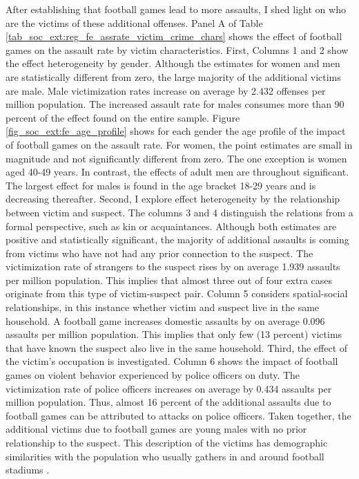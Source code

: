 

After establishing that football games lead to more assaults, I shed light on who are the victims of these additional offenses. Panel A of Table \ref{tab_soc_ext:reg_fe_assrate_victim_crime_chars} shows the effect of football games on the assault rate by victim characteristics. First, Columns 1 and 2 show the effect heterogeneity by gender. Although the estimates for women and men are statistically different from zero, the large majority of the additional victims are male. Male victimization rates increase on average by 2.432 offenses per million population. The increased assault rate for males consumes more than 90 percent of the effect found on the entire sample. Figure \ref{fig_soc_ext:fe_age_profile} shows for each gender the age profile of the impact of football games on the assault rate. For women, the point estimates are small in magnitude and not significantly different from zero. The one exception is women aged 40-49 years. In contrast, the effects of adult men are throughout significant. The largest effect for males is found in the age bracket 18-29 years and is decreasing thereafter. Second, I explore effect heterogeneity by the relationship between victim and suspect. The columns 3 and 4 distinguish the relations from a formal perspective, such as kin or acquaintances. Although both estimates are positive and statistically significant, the majority of additional assaults is coming from victims who have not had any prior connection to the suspect. The victimization rate of strangers to the suspect rises by on average 1.939 assaults per million population. This implies that almost three out of four extra cases originate from this type of victim-suspect pair. Column 5 considers spatial-social relationships, in this instance whether victim and suspect live in the same household. A football game increases domestic assaults by on average 0.096 assaults per million population. This implies that only few (13 percent) victims that have known the suspect also live in the same household. Third, the effect of the victim's occupation is investigated. Column 6 shows the impact of football games on violent behavior experienced by police officers on duty. The victimization rate of police officers increases on average by 0.434 assaults per million population. Thus, almost 16 percent of the additional assaults due to football games can be attributed to attacks on police officers. Taken together, the additional victims due to football games are young males with no prior relationship to the suspect. This description of the victims has demographic similarities with the population who usually gathers in and around football stadiums \citep{pwc2016}.

